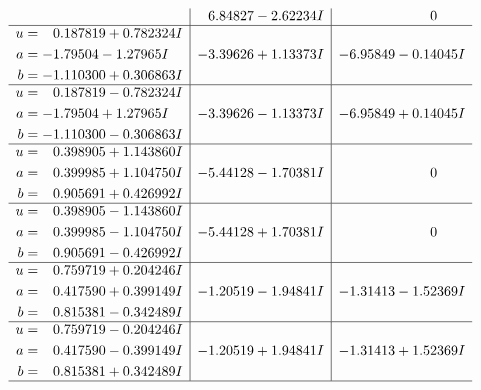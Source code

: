 \documentclass[1p]{elsarticle_modified}
\theoremstyle{definition}
\begin{document}
$$\begin{array}{c|c|c}
 & \phantom{-}6.84827 - 2.62234 I & \phantom{-0.000000 } 0 \\ \hline\begin{aligned}
u &= \phantom{-}0.187819 + 0.782324 I \\
a &= -1.79504 - 1.27965 I \\
b &= -1.110300 + 0.306863 I\end{aligned}
 & -3.39626 + 1.13373 I & -6.95849 - 0.14045 I \\ \hline\begin{aligned}
u &= \phantom{-}0.187819 - 0.782324 I \\
a &= -1.79504 + 1.27965 I \\
b &= -1.110300 - 0.306863 I\end{aligned}
 & -3.39626 - 1.13373 I & -6.95849 + 0.14045 I \\ \hline\begin{aligned}
u &= \phantom{-}0.398905 + 1.143860 I \\
a &= \phantom{-}0.399985 + 1.104750 I \\
b &= \phantom{-}0.905691 + 0.426992 I\end{aligned}
 & -5.44128 - 1.70381 I & \phantom{-0.000000 } 0 \\ \hline\begin{aligned}
u &= \phantom{-}0.398905 - 1.143860 I \\
a &= \phantom{-}0.399985 - 1.104750 I \\
b &= \phantom{-}0.905691 - 0.426992 I\end{aligned}
 & -5.44128 + 1.70381 I & \phantom{-0.000000 } 0 \\ \hline\begin{aligned}
u &= \phantom{-}0.759719 + 0.204246 I \\
a &= \phantom{-}0.417590 + 0.399149 I \\
b &= \phantom{-}0.815381 - 0.342489 I\end{aligned}
 & -1.20519 - 1.94841 I & -1.31413 - 1.52369 I \\ \hline\begin{aligned}
u &= \phantom{-}0.759719 - 0.204246 I \\
a &= \phantom{-}0.417590 - 0.399149 I \\
b &= \phantom{-}0.815381 + 0.342489 I\end{aligned}
 & -1.20519 + 1.94841 I & -1.31413 + 1.52369 I\\
 \hline 
 \end{array}$$\newpage$$\begin{array}{c|c|c}  

\end{array}$$
\end{document}
